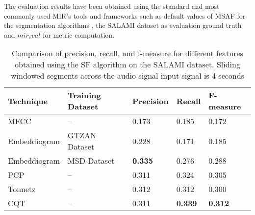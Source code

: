 
The evaluation results have been obtained using the standard and most commonly used MIR's tools and frameworks such as default values of MSAF \cite{MSAF} for the segmentation algorithms \cite{sf}, the SALAMI dataset \cite{Smith2011DESIGNANNOTATIONS} as evaluation ground truth and $mir_eval$ \cite{RaffelMir_eval:METRICS} for metric computation.


\begin{table}[h]
\centering
\begin{tabularx}{\textwidth}{|X|X|X|X|X|}
\hline
\textbf{Technique} & \textbf{Training Dataset} & \textbf{Precision} & \textbf{Recall} & \textbf{F-measure} \\
\hline
MFCC & -- & 0.173 & 0.185 & 0.172 \\
\hline
Embeddiogram & GTZAN Dataset & 0.228 & 0.171 & 0.185 \\
\hline
Embeddiogram & MSD Dataset & \textbf{0.335} & 0.276 & 0.288 \\
\hline
PCP & -- & 0.311 & 0.324 & 0.305 \\
\hline
Tonnetz & -- & 0.312 & 0.312 & 0.300 \\
\hline
CQT & -- & 0.311 & \textbf{0.339} & \textbf{0.312} \\
\hline
\end{tabularx}
\caption[Comparison of precision, recall, and f-measure for different audio features]{Comparison of precision, recall, and f-measure for different features obtained using the SF algorithm \cite{sf} on the SALAMI dataset. Sliding windowed segments across the audio signal input signal is 4 seconds}
\label{tab:comparison}
\end{table}



